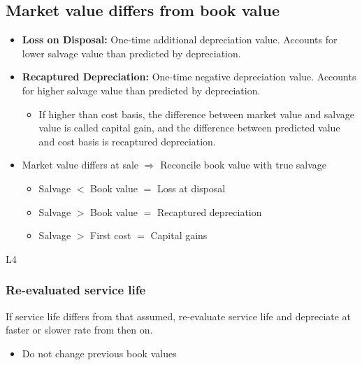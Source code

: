 \subsection{Market value differs from book value}
\begin{definition}
    \begin{itemize}
        \item \textbf{Loss on Disposal:} One-time additional depreciation value. Accounts for lower salvage value than predicted by depreciation.
        
        \item \textbf{Recaptured Depreciation:} One-time negative depreciation value. Accounts for higher salvage value than predicted by depreciation.
            \begin{itemize}
                \item If higher than cost basis, the difference between market value and salvage value is called capital gain, and the difference between predicted value and cost basis is recaptured depreciation.
            \end{itemize}
    \end{itemize}

    \begin{itemize}
        \item Market value differs at sale $\Rightarrow$ Reconcile book value with true salvage
        \begin{itemize}
            \item Salvage $<$ Book value $=$ Loss at disposal
            \item Salvage $>$ Book value $=$ Recaptured depreciation
            \item Salvage $>$ First cost $=$ Capital gains
        \end{itemize}
    \end{itemize}
    
\end{definition}

\begin{example}
    L4
\end{example}

\subsubsection{Re-evaluated service life}
\begin{definition}
    If service life differs from that assumed, re-evaluate service life and depreciate at faster or slower rate from then on. 
    \begin{itemize}
        \item Do not change previous book values
    \end{itemize}
\end{definition}

